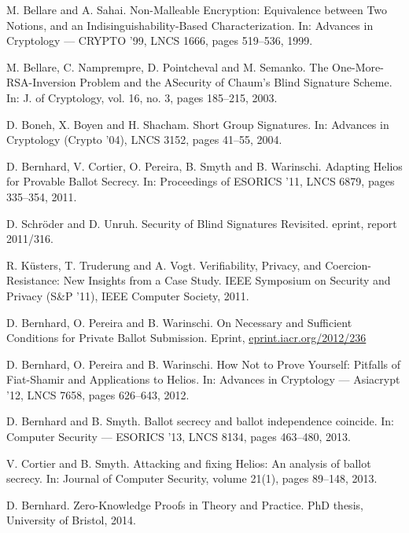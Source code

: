 \documentclass[envcountsame]{llncs}
\begin{document}
\begin{thebibliography}{XXX11}
M. Bellare and A. Sahai.
Non-Malleable Encryption: Equivalence between Two Notions, and an Indisinguishability-Based Characterization.
In: Advances in Cryptology --- CRYPTO '99, LNCS 1666, pages 519--536, 1999.

\bibitem[BNPS03]
M. Bellare, C. Namprempre, D. Pointcheval and M. Semanko.
The One-More-RSA-Inversion Problem and the ASecurity of Chaum's Blind Signature Scheme.
In: J. of Cryptology,  vol. 16, no. 3, pages 185--215, 2003.

D. Boneh, X. Boyen and H. Shacham.
Short Group Signatures.
In: Advances in Cryptology (Crypto '04), LNCS 3152, pages 41--55, 2004.

D. Bernhard, V. Cortier, O. Pereira, B. Smyth and B. Warinschi.
Adapting Helios for Provable Ballot Secrecy.
In: Proceedings of ESORICS '11, LNCS 6879, pages 335--354, 2011.

D. Schr\"oder and D. Unruh.
Security of Blind Signatures Revisited.
eprint, report 2011/316.

R. Küsters, T. Truderung and A. Vogt.
Verifiability, Privacy, and Coercion-Resistance: New Insights from a Case Study.
IEEE Symposium on Security and Privacy (S\&P '11), IEEE Computer Society, 2011.

D. Bernhard, O. Pereira and B. Warinschi.
On Necessary and Sufficient Conditions for Private Ballot Submission.
Eprint, \url{eprint.iacr.org/2012/236}

D. Bernhard, O. Pereira and B. Warinschi.
How Not to Prove Yourself: Pitfalls of Fiat-Shamir and Applications to Helios.
In: Advances in Cryptology --- Asiacrypt '12, LNCS 7658, pages 626--643, 2012.

D. Bernhard and B. Smyth.
Ballot secrecy and ballot independence coincide.
In: Computer Security --- ESORICS '13, LNCS 8134, pages 463--480, 2013.

V. Cortier and B. Smyth.
Attacking and fixing Helios: An analysis of ballot secrecy.
In: Journal of Computer Security, volume 21(1), pages 89--148, 2013.

D. Bernhard.
Zero-Knowledge Proofs in Theory and Practice.
PhD thesis, University of Bristol, 2014.

\end{thebibliography}
\end{document}
